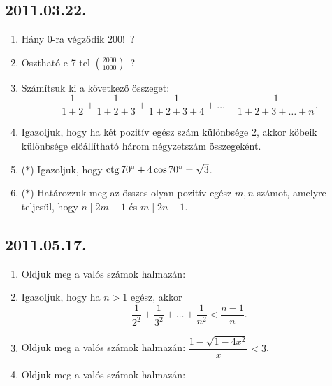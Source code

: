 \subsection*{2011.03.22.}
\begin{enumerate}
\item Hány 0-ra végződik $200!$\, ?
\item Osztható-e 7-tel $\binom{2000}{1000}$\, ?
\item Számítsuk ki a következő összeget:
$$\dfrac{1}{1+2}+\dfrac{1}{1+2+3}+\dfrac{1}{1+2+3+4}+\ldots+\dfrac{1}{1+2+3+\ldots+n}.$$
\item Igazoljuk, hogy ha két pozitív egész szám különbsége 2, akkor köbeik különbsége előállítható három négyzetszám összegeként.
\item ($*$) Igazoljuk, hogy $\mathop{\mathrm{ctg}}\nolimits 70^\circ+4\cos 70^\circ=\sqrt{3}$.
\item ($*$) Határozzuk meg az összes olyan pozitív egész $m,n$ számot, amelyre teljesül, hogy $n\mid 2m-1$ és $m\mid 2n-1$.
\end{enumerate}

\subsection*{2011.05.17.}
\begin{enumerate}
\item Oldjuk meg a valós számok halmazán:
\item Igazoljuk, hogy ha $n>1$ egész, akkor
$$\dfrac{1}{2^2}+\dfrac{1}{3^2}+\ldots+\dfrac{1}{n^2}<\dfrac{n-1}{n}.$$
\item Oldjuk meg a valós számok halmazán: $\dfrac{1-\sqrt{1-4x^2}}{x}<3$.
\item Oldjuk meg a valós számok halmazán:
\end{enumerate}

